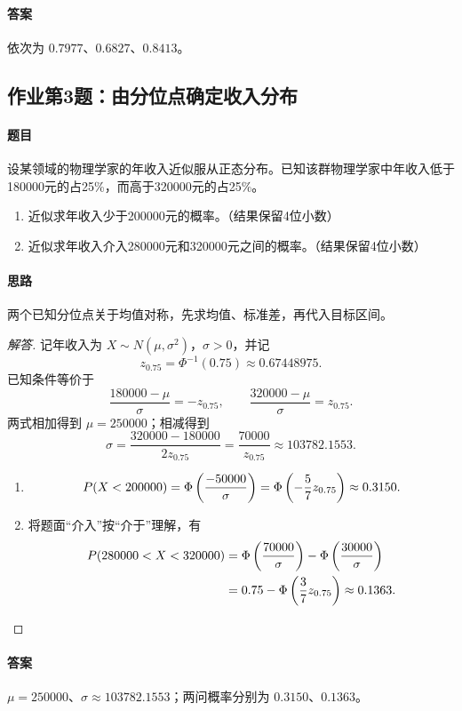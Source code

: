 \paragraph{答案} 依次为 $0.7977$、$0.6827$、$0.8413$。

\subsection{作业第3题：由分位点确定收入分布}\label{ex:w09-h3}
\paragraph{题目}
设某领域的物理学家的年收入近似服从正态分布。已知该群物理学家中年收入低于180000元的占25\%，而高于320000元的占25\%。
\begin{enumerate}
\item 近似求年收入少于200000元的概率。（结果保留4位小数）
\item 近似求年收入介入280000元和320000元之间的概率。（结果保留4位小数）
\end{enumerate}
\paragraph{思路} 两个已知分位点关于均值对称，先求均值、标准差，再代入目标区间。
\begin{proof}[解答]
记年收入为 $X\sim N(\mu,\sigma^2)$，$\sigma>0$，并记
\[
z_{0.75}=\Phi^{-1}(0.75)\approx0.67448975.
\]
已知条件等价于
\[
\frac{180000-\mu}{\sigma}=-z_{0.75},\qquad
\frac{320000-\mu}{\sigma}=z_{0.75}.
\]
两式相加得到 $\mu=250000$；相减得到
\[
\sigma=\frac{320000-180000}{2z_{0.75}}
=\frac{70000}{z_{0.75}}\approx103782.1553.
\]
\begin{enumerate}
\item
\[
\P(X<200000)=\Phi\left(\frac{-50000}{\sigma}\right)
=\Phi\left(-\frac57z_{0.75}\right)\approx0.3150.
\]
\item 将题面“介入”按“介于”理解，有
\begin{align*}
\P(280000<X<320000)
&=\Phi\left(\frac{70000}{\sigma}\right)
-\Phi\left(\frac{30000}{\sigma}\right)\\
&=0.75-\Phi\left(\frac37z_{0.75}\right)\approx0.1363.
\end{align*}
\end{enumerate}
\end{proof}
\paragraph{答案} $\mu=250000$、$\sigma\approx103782.1553$；两问概率分别为 $0.3150$、$0.1363$。

